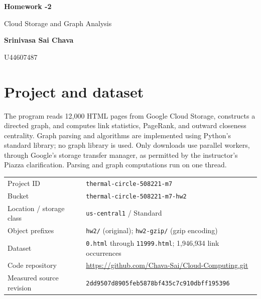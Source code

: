 \documentclass[10pt,letterpaper]{article}
\newcommand{\repo}{\url{https://github.com/Chava-Sai/Cloud-Computing.git}}
\begin{document}
\thispagestyle{empty}
\noindent
\begin{minipage}[t]{0.59\linewidth}
\vspace{0pt}
{\LARGE\bfseries Homework -2}\par
\vspace{4pt}
{\large Cloud Storage and Graph Analysis}
\end{minipage}\hfill
\begin{minipage}[t]{0.39\linewidth}
\vspace{0pt}
\raggedleft
{\fontsize{14}{18}\selectfont\bfseries Srinivasa Sai Chava\par}
\vspace{4pt}
{\fontsize{14}{18}\selectfont U44607487\par}
\end{minipage}
\par\vspace{12pt}

\section{Project and dataset}
The program reads 12,000 HTML pages from Google Cloud Storage, constructs a
directed graph, and computes link statistics, PageRank, and outward closeness
centrality. Graph parsing and algorithms are implemented using Python's standard
library; no graph library is used. Only downloads use parallel workers, through
Google's storage transfer manager, as permitted by the instructor's Piazza
clarification. Parsing and graph computations run on one thread.

\begin{tabularx}{\linewidth}{@{}lY@{}}
\toprule
Project ID & \texttt{thermal-circle-508221-m7} \\
Bucket & \texttt{thermal-circle-508221-m7-hw2} \\
Location / storage class & \texttt{us-central1} / Standard \\
Object prefixes & \texttt{hw2/} (original); \texttt{hw2-gzip/} (gzip encoding) \\
Dataset & \texttt{0.html} through \texttt{11999.html}; 1,946,934 link occurrences \\
Code repository & \repo \\
Measured source revision & \texttt{2dd9507d8905feb5878bf435c7c910dbff195396} \\
\bottomrule
\end{tabularx}
\end{document}
